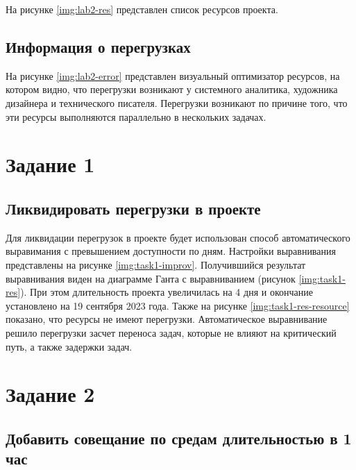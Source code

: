 На рисунке \ref{img:lab2-res} представлен список ресурсов проекта.



\subsection{Информация о перегрузках}

На рисунке \ref{img:lab2-error} представлен визуальный оптимизатор ресурсов, на котором видно, что перегрузки возникают у системного аналитика, художника дизайнера и технического писателя. Перегрузки возникают по причине того, что эти ресурсы выполняются параллельно в нескольких задачах.



\section{Задание 1}

\subsection{Ликвидировать перегрузки в проекте}

Для ликвидации перегрузок в проекте будет использован способ автоматического выравимания с превышением доступности по дням. Настройки выравнивания представлены на рисунке \ref{img:task1-improv}. Получившийся результат выравнивания виден на диаграмме Ганта с выравниванием (рисунок \ref{img:task1-res}). При этом длительность проекта увеличилась на 4 дня и окончание установлено на 19 сентября 2023 года. Также на рисунке \ref{img:task1-res-resource} показано, что ресурсы не имеют перегрузки. Автоматическое выравнивание решило перегрузки засчет переноса задач, которые не влияют на критический путь, а также задержки задач.




\section{Задание 2}

\subsection{Добавить совещание по средам длительностью в 1 час}

